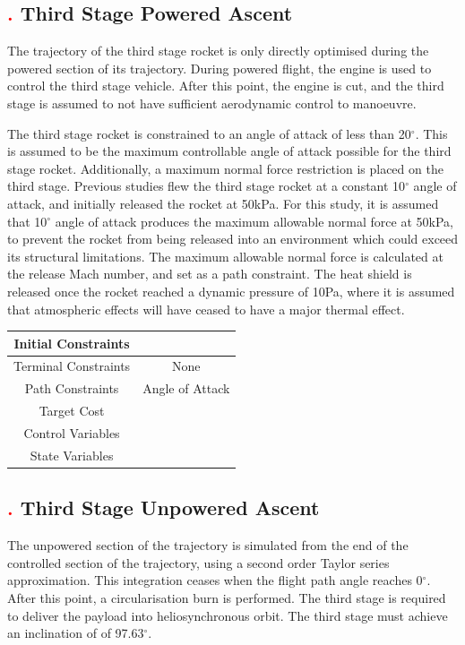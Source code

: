 \subsection{\textcolor{red}{.} Third Stage Powered Ascent}

The trajectory of the third stage rocket is only directly optimised during the powered section of its trajectory. During powered flight, the engine is used to control the third stage vehicle. After this point, the engine is cut, and the third stage is assumed to not have sufficient aerodynamic control to manoeuvre. 

The third stage rocket is constrained to an angle of attack of less than 20$^\circ$. This is assumed to be the maximum controllable angle of attack possible for the third stage rocket.   
Additionally, a maximum normal force restriction is placed on the third stage. Previous studies flew the third stage rocket at a constant 10$^\circ$ angle of attack, and initially released the rocket at 50kPa. 
For this study, it is assumed that 10$^\circ$ angle of attack produces the maximum allowable normal force at 50kPa, to prevent the rocket from being released into an environment which could exceed its structural limitations. The maximum allowable normal force is calculated at the release Mach number, and set as a path constraint. 
The heat shield is released once the rocket reached a dynamic pressure of 10Pa, where it is assumed that atmospheric effects will have ceased to have a major thermal effect. 

\begin{tabular}{|c|c|}
	\hline Initial Constraints  & \\ 
	\hline Terminal Constraints & None \\ 
	\hline Path Constraints & Angle of Attack \\ 
	\hline Target Cost &  \\ 
				\hline Control Variables &  \\ 
				\hline State Variables &  \\ 
	\hline 
\end{tabular} 


\subsection{\textcolor{red}{.} Third Stage Unpowered Ascent}

The unpowered section of the trajectory is simulated from the end of the controlled section of the trajectory, using a second order Taylor series approximation. This integration ceases when the flight path angle reaches 0$^{\circ}$. After this point, a circularisation burn is performed. The third stage is required to deliver the payload into heliosynchronous orbit. The third stage must achieve an inclination of of 97.63$^\circ$.



